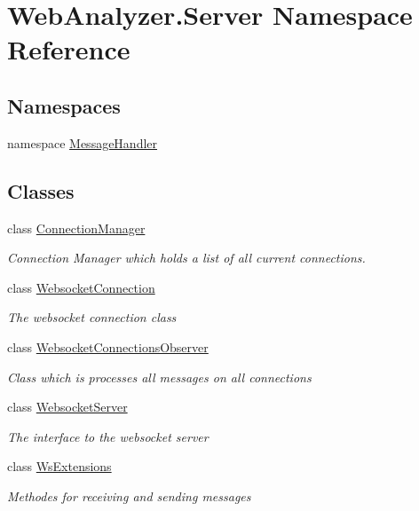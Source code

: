 \hypertarget{namespace_web_analyzer_1_1_server}{}\section{Web\+Analyzer.\+Server Namespace Reference}
\label{namespace_web_analyzer_1_1_server}
\subsection*{Namespaces}
\begin{DoxyCompactItemize}
\item 
namespace \hyperlink{namespace_web_analyzer_1_1_server_1_1_message_handler}{Message\+Handler}
\end{DoxyCompactItemize}
\subsection*{Classes}
\begin{DoxyCompactItemize}
\item 
class \hyperlink{class_web_analyzer_1_1_server_1_1_connection_manager}{Connection\+Manager}
\begin{DoxyCompactList}\small\item\em Connection Manager which holds a list of all current connections. \end{DoxyCompactList}\item 
class \hyperlink{class_web_analyzer_1_1_server_1_1_websocket_connection}{Websocket\+Connection}
\begin{DoxyCompactList}\small\item\em The websocket connection class \end{DoxyCompactList}\item 
class \hyperlink{class_web_analyzer_1_1_server_1_1_websocket_connections_observer}{Websocket\+Connections\+Observer}
\begin{DoxyCompactList}\small\item\em Class which is processes all messages on all connections \end{DoxyCompactList}\item 
class \hyperlink{class_web_analyzer_1_1_server_1_1_websocket_server}{Websocket\+Server}
\begin{DoxyCompactList}\small\item\em The interface to the websocket server \end{DoxyCompactList}\item 
class \hyperlink{class_web_analyzer_1_1_server_1_1_ws_extensions}{Ws\+Extensions}
\begin{DoxyCompactList}\small\item\em Methodes for receiving and sending messages \end{DoxyCompactList}\end{DoxyCompactItemize}
